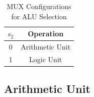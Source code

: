 \documentclass{article}
\begin{document}
\begin{table}[htpb]
  \caption{MUX Configurations for ALU Selection}\label{tab:ALU_selection}
  \begin{center}
    \begin{tabular}{c|c}
      \hline
      \( s_{2} \) & Operation \\
      \hline
      0 & Arithmetic Unit \\
      1 & Logic Unit \\
      \hline
    \end{tabular}
  \end{center}
\end{table}


\subsection{Arithmetic Unit}
\end{document}

